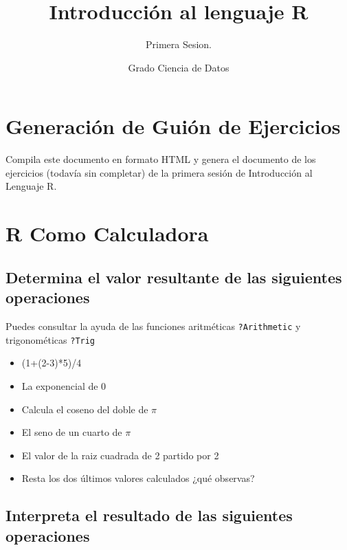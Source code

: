 \documentclass[
]{article}
\title{Introducción al lenguaje R}
\subtitle{Primera Sesion.}
\author{Grado Ciencia de Datos}
\date{}
\providecommand{\tightlist}{%
  \setlength{\itemsep}{0pt}\setlength{\parskip}{0pt}}
\begin{document}
\maketitle

\hypertarget{generaciuxf3n-de-guiuxf3n-de-ejercicios}{%
\section{Generación de Guión de
Ejercicios}\label{generaciuxf3n-de-guiuxf3n-de-ejercicios}}

Compila este documento en formato HTML y genera el documento de los
ejercicios (todavía sin completar) de la primera sesión de Introducción
al Lenguaje R.

\hypertarget{r-como-calculadora}{%
\section{R Como Calculadora}\label{r-como-calculadora}}

\hypertarget{determina-el-valor-resultante-de-las-siguientes-operaciones}{%
\subsection{Determina el valor resultante de las siguientes
operaciones}\label{determina-el-valor-resultante-de-las-siguientes-operaciones}}

Puedes consultar la ayuda de las funciones aritméticas
\texttt{?Arithmetic} y trigonométicas \texttt{?Trig}

\begin{itemize}
\tightlist
\item
  (1+(2-3)*5)/4
\item
  La exponencial de 0
\item
  Calcula el coseno del doble de \(\pi\)
\item
  El seno de un cuarto de \(\pi\)
\item
  El valor de la raiz cuadrada de 2 partido por 2
\item
  Resta los dos últimos valores calculados ¿qué observas?
\end{itemize}

\hypertarget{interpreta-el-resultado-de-las-siguientes-operaciones}{%
\subsection{Interpreta el resultado de las siguientes
operaciones}\label{interpreta-el-resultado-de-las-siguientes-operaciones}}
\end{document}
